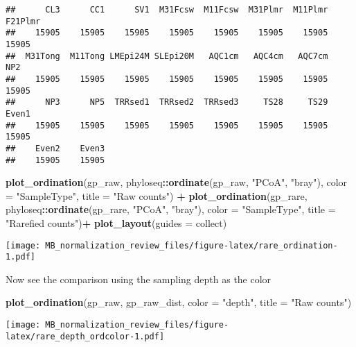 \documentclass[
]{book}
\newenvironment{Shaded}{\begin{snugshade}}{\end{snugshade}}
\newcommand{\DataTypeTok}[1]{\textcolor[rgb]{0.13,0.29,0.53}{#1}}
\newcommand{\KeywordTok}[1]{\textcolor[rgb]{0.13,0.29,0.53}{\textbf{#1}}}
\newcommand{\NormalTok}[1]{#1}
\newcommand{\OperatorTok}[1]{\textcolor[rgb]{0.81,0.36,0.00}{\textbf{#1}}}
\newcommand{\StringTok}[1]{\textcolor[rgb]{0.31,0.60,0.02}{#1}}
\begin{document}
\begin{verbatim}
##      CL3      CC1      SV1  M31Fcsw  M11Fcsw  M31Plmr  M11Plmr  F21Plmr 
##    15905    15905    15905    15905    15905    15905    15905    15905 
##  M31Tong  M11Tong LMEpi24M SLEpi20M   AQC1cm   AQC4cm   AQC7cm      NP2 
##    15905    15905    15905    15905    15905    15905    15905    15905 
##      NP3      NP5  TRRsed1  TRRsed2  TRRsed3     TS28     TS29    Even1 
##    15905    15905    15905    15905    15905    15905    15905    15905 
##    Even2    Even3 
##    15905    15905
\end{verbatim}

\begin{Shaded}
\begin{Highlighting}[]
\KeywordTok{plot\_ordination}\NormalTok{(gp\_raw,}
\NormalTok{                phyloseq}\OperatorTok{::}\KeywordTok{ordinate}\NormalTok{(gp\_raw, }\StringTok{"PCoA"}\NormalTok{, }\StringTok{"bray"}\NormalTok{),}
                \DataTypeTok{color =} \StringTok{"SampleType"}\NormalTok{, }
                \DataTypeTok{title =} \StringTok{"Raw counts"}\NormalTok{) }\OperatorTok{+}
\KeywordTok{plot\_ordination}\NormalTok{(gp\_rare,}
\NormalTok{                phyloseq}\OperatorTok{::}\KeywordTok{ordinate}\NormalTok{(gp\_rare, }\StringTok{"PCoA"}\NormalTok{, }\StringTok{"bray"}\NormalTok{),}
                \DataTypeTok{color =} \StringTok{"SampleType"}\NormalTok{, }
                \DataTypeTok{title =} \StringTok{"Rarefied counts"}\NormalTok{)}\OperatorTok{+}
\StringTok{  }\KeywordTok{plot\_layout}\NormalTok{(}\DataTypeTok{guides =} \StringTok{\textquotesingle{}collect\textquotesingle{}}\NormalTok{)}
\end{Highlighting}
\end{Shaded}

\texttt{[image: MB\_normalization\_review\_files/figure-latex/rare\_ordination-1.pdf]}

Now see the comparison using the sampling depth as the color

\begin{Shaded}
\begin{Highlighting}[]
\KeywordTok{plot\_ordination}\NormalTok{(gp\_raw,}
\NormalTok{                gp\_raw\_dist,}
                \DataTypeTok{color =} \StringTok{"depth"}\NormalTok{, }
                \DataTypeTok{title =} \StringTok{"Raw counts"}\NormalTok{)}
\end{Highlighting}
\end{Shaded}

\texttt{[image: MB\_normalization\_review\_files/figure-latex/rare\_depth\_ordcolor-1.pdf]}
\end{document}
